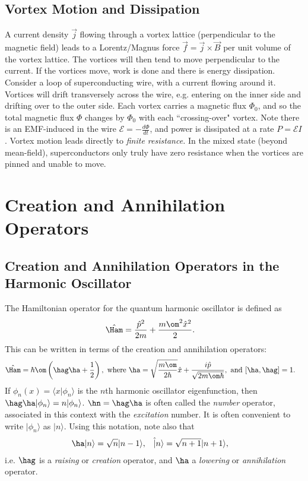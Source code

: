 \documentclass[a4paper, 11pt, normalem]{report}
\begin{document}
\section{Vortex Motion and Dissipation}
A current density $\vec{j}$ flowing through a vortex lattice (perpendicular to the magnetic field) leads to a Lorentz/Magnus force $\vec{f}=\vec{j}\times\vec{B}$ per unit volume of the vortex lattice.
The vortices will then tend to move perpendicular to the current.
If the vortices move, work is done and there is energy dissipation.
Consider a loop of superconducting wire, with a current flowing around it.
Vortices will drift transversely across the wire, e.g. entering on the inner side and drifting over to the outer side.
Each vortex carries a magnetic flux $\Phi_0$, and so the total magnetic flux $\Phi$ changes by $\Phi_0$ with each ``crossing-over" vortex.
Note there is an EMF-induced in the wire $\mathcal{E}=-\frac{d\Phi}{dt}$, and power is dissipated at a rate $P=\mathcal{E}I$.
Vortex motion leads directly to \emph{finite resistance.}
In the mixed state (beyond mean-field), superconductors only truly have zero resistance when the vortices are pinned and unable to move.

\chapter{Creation and Annihilation Operators}
\section{Creation and Annihilation Operators in the Harmonic Oscillator}
The Hamiltonian operator for the quantum harmonic oscillator is defined as
\begin{align}
    \hat{\Ham} &= \frac{\hat{p}^2}{2m} + \frac{m\om^2\hat{x}^2}{2}.
\end{align}
This can be written in terms of the creation and annihilation operators:
\begin{align}
    \hat{\Ham} &= \hbar\om\left(\hag\ha+\frac12\right), \text{ where } \ha = \sqrt{\frac{m\om}{2\hbar}}\hat{x} + \frac{i\hat{p}}{\sqrt{2m\om\hbar}}, \text{ and } [\ha,\hag] = 1.
\end{align}
If $\phi_n(x)=\langle x|\phi_n\rangle$ is the $n$th harmonic oscillator eigenfunction, then $\hag\ha|\phi_n\rangle=n|\phi_n\rangle$.
$\hn=\hag\ha$ is often called the \emph{number} operator, associated in this context with the \emph{excitation} number.
It is often convenient to write $|\phi_n\rangle$ as $|n\rangle$.
Using this notation, note also that
\begin{align}
    \ha|n\rangle &= \sqrt{n}|n-1\rangle, & \hat|n\rangle &= \sqrt{n+1}|n+1\rangle,
\end{align}
i.e. $\hag$ is a \emph{raising} or \emph{creation} operator, and $\ha$ a \emph{lowering} or \emph{annihilation} operator.
\end{document}
